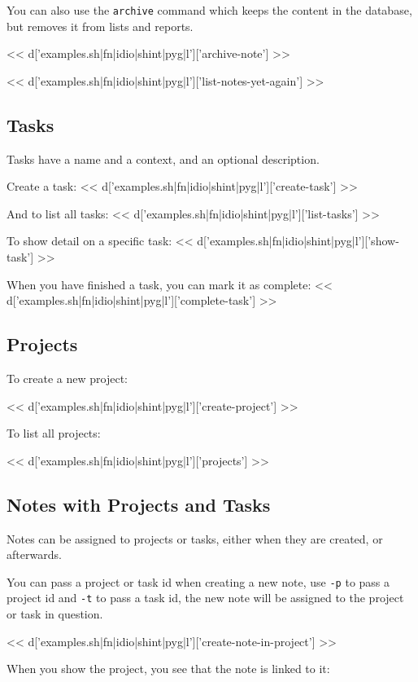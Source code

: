 \documentclass[a4paper]{amsart}
\begin{document}
You can also use the \verb|archive| command which keeps the content in the
database, but removes it from lists and reports.

<< d['examples.sh|fn|idio|shint|pyg|l']['archive-note'] >>

<< d['examples.sh|fn|idio|shint|pyg|l']['list-notes-yet-again'] >>

\subsection{Tasks}

Tasks have a name and a context, and an optional description.

Create a task:
<< d['examples.sh|fn|idio|shint|pyg|l']['create-task'] >>

And to list all tasks:
<< d['examples.sh|fn|idio|shint|pyg|l']['list-tasks'] >>

To show detail on a specific task:
<< d['examples.sh|fn|idio|shint|pyg|l']['show-task'] >>

When you have finished a task, you can mark it as complete:
<< d['examples.sh|fn|idio|shint|pyg|l']['complete-task'] >>

\subsection{Projects}

To create a new project:

<< d['examples.sh|fn|idio|shint|pyg|l']['create-project'] >>

To list all projects:

<< d['examples.sh|fn|idio|shint|pyg|l']['projects'] >>

\subsection{Notes with Projects and Tasks}

Notes can be assigned to projects or tasks, either when they are created, or
afterwards.

You can pass a project or task id when creating a new note, use \verb|-p| to
pass a project id and \verb|-t| to pass a task id, the new note will be
assigned to the project or task in question.

<< d['examples.sh|fn|idio|shint|pyg|l']['create-note-in-project'] >>

When you show the project, you see that the note is linked to it:
\end{document}
